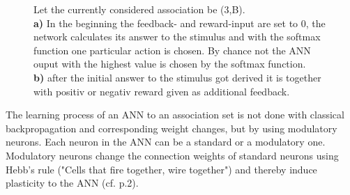 \documentclass[12pt,twoside]{article}
\theoremstyle{plain}
\theoremstyle{definition}
\theoremstyle{remark}
\begin{document}
\begin{figure}[!tbp]
	\caption[Let the currently considered association be (3,B). \textbf{a)} In the beginning the feedback- and reward-input are set to 0, the network calculates its answer to the stimulus and with the softmax function one particular action is chosen. By chance not the ANN ouput with the highest value is chosen by the softmax function. \textbf{b)} after the initial answer to the stimulus got derived it is together with positiv or negativ reward given as additional feedback.]{Let the currently considered association be (3,B).\\ \textbf{a)} In the beginning the feedback- and reward-input are set to 0, the network calculates its answer to the stimulus and with the softmax function one particular action is chosen. By chance not the ANN ouput with the highest value is chosen by the softmax function.\\ \textbf{b)} after the initial answer to the stimulus got derived it is together with positiv or negativ reward given as additional feedback.\footnotemark}
	\label{fig:input}
\end{figure}

The learning process of an ANN to an association set is not done with classical backpropagation and corresponding weight changes, but by using modulatory neurons.
Each neuron in the ANN can be a standard or a modulatory one.
Modulatory neurons change the connection weights of standard neurons using Hebb's rule ("Cells that fire together, wire together") and thereby induce plasticity to the ANN (cf. \cite{citeulike:12788284} p.2).\medskip
\end{document}
